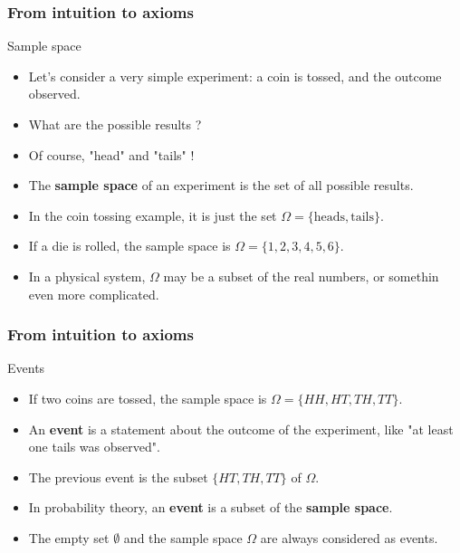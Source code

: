 \begin{frame}
    \frametitle{From intuition to axioms }
\begin{block}{Sample space}
    \begin{itemize}
        \item<+-> Let's consider a very simple experiment: a coin is tossed, and the outcome observed.
        \item<+-> What are the possible results ?
        \item<+-> Of course, "head" and "tails" !
        \item<+-> The \textbf{sample space} of an experiment is the set of all possible results.
        \item<+-> In the coin tossing example, it is just the set $\Omega = \{ \text{heads}, \text{tails}\}.$
        \item<+-> If a die is rolled, the sample space is $\Omega = \{ 1,2,3,4,5, 6\}.$
        \item<+-> In a physical system, $\Omega$ may be a subset of the real numbers,
        or somethin even more complicated.
    \end{itemize}
\end{block}    
\end{frame}
\begin{frame}
    \frametitle{From intuition to axioms}
\begin{block}{Events}
    \begin{itemize}
        \item<+-> If two coins are tossed, the sample space is 
        $\Omega = \{ HH, HT, TH, TT \}.$
        \item<+-> An \textbf{event} is a statement about the outcome of the experiment, 
        like "at least one tails was observed".
        \item<+-> The previous event is the subset $\{HT,TH,TT\}$ of $\Omega.$
        \item<+-> In probability theory, an \textbf{event} is a subset of the \textbf{sample space}.
        \item<+-> The empty set $\emptyset$ and the sample space $\Omega$ are 
        always considered as events.
    \end{itemize}
\end{block}
\end{frame}

